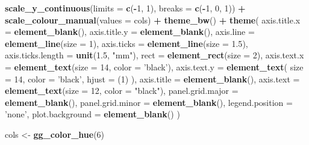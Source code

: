 \documentclass[
]{krantz}
\makeatletter
\newenvironment{Shaded}{\begin{snugshade}}{\end{snugshade}}
\newcommand{\DataTypeTok}[1]{\textcolor[rgb]{0.13,0.29,0.53}{#1}}
\newcommand{\DecValTok}[1]{\textcolor[rgb]{0.00,0.00,0.81}{#1}}
\newcommand{\FloatTok}[1]{\textcolor[rgb]{0.00,0.00,0.81}{#1}}
\newcommand{\KeywordTok}[1]{\textcolor[rgb]{0.13,0.29,0.53}{\textbf{#1}}}
\newcommand{\NormalTok}[1]{#1}
\newcommand{\OperatorTok}[1]{\textcolor[rgb]{0.81,0.36,0.00}{\textbf{#1}}}
\newcommand{\StringTok}[1]{\textcolor[rgb]{0.31,0.60,0.02}{#1}}
\newenvironment{kframe}{%
\medskip{}
\setlength{\fboxsep}{.8em}
 \def\at@end@of@kframe{}%
 \ifinner\ifhmode%
  \def\at@end@of@kframe{\end{minipage}}%
  \begin{minipage}{\columnwidth}%
 \fi\fi%
 \def\FrameCommand##1{\hskip\@totalleftmargin \hskip-\fboxsep
 \colorbox{shadecolor}{##1}\hskip-\fboxsep
     \hskip-\linewidth \hskip-\@totalleftmargin \hskip\columnwidth}%
 \MakeFramed {\advance\hsize-\width
   \@totalleftmargin\z@ \linewidth\hsize
   \@setminipage}}%
 {\par\unskip\endMakeFramed%
 \at@end@of@kframe}
\renewenvironment{Shaded}{\begin{kframe}}{\end{kframe}}
\makeatother
\begin{document}
\begin{Shaded}
\begin{Highlighting}[]
\StringTok{  }\KeywordTok{scale_y_continuous}\NormalTok{(}\DataTypeTok{limits =} \KeywordTok{c}\NormalTok{(}\OperatorTok{-}\DecValTok{1}\NormalTok{, }\DecValTok{1}\NormalTok{), }\DataTypeTok{breaks =} \KeywordTok{c}\NormalTok{(}\OperatorTok{-}\DecValTok{1}\NormalTok{, }\DecValTok{0}\NormalTok{, }\DecValTok{1}\NormalTok{)) }\OperatorTok{+}
\StringTok{  }\KeywordTok{scale_colour_manual}\NormalTok{(}\DataTypeTok{values =}\NormalTok{ cols) }\OperatorTok{+}
\StringTok{  }\KeywordTok{theme_bw}\NormalTok{() }\OperatorTok{+}
\StringTok{  }\KeywordTok{theme}\NormalTok{(}
    \DataTypeTok{axis.title.x =} \KeywordTok{element_blank}\NormalTok{(),}
    \DataTypeTok{axis.title.y =} \KeywordTok{element_blank}\NormalTok{(),}
    \DataTypeTok{axis.line =} \KeywordTok{element_line}\NormalTok{(}\DataTypeTok{size =} \DecValTok{1}\NormalTok{),}
    \DataTypeTok{axis.ticks =} \KeywordTok{element_line}\NormalTok{(}\DataTypeTok{size =} \FloatTok{1.5}\NormalTok{),}
    \DataTypeTok{axis.ticks.length =} \KeywordTok{unit}\NormalTok{(}\FloatTok{1.5}\NormalTok{, }\StringTok{"mm"}\NormalTok{),}
    \DataTypeTok{rect =} \KeywordTok{element_rect}\NormalTok{(}\DataTypeTok{size =} \DecValTok{2}\NormalTok{),}
    \DataTypeTok{axis.text.x =} \KeywordTok{element_text}\NormalTok{(}\DataTypeTok{size =} \DecValTok{14}\NormalTok{, }\DataTypeTok{color =} \StringTok{'black'}\NormalTok{),}
    \DataTypeTok{axis.text.y =}
      \KeywordTok{element_text}\NormalTok{(}
        \DataTypeTok{size =} \DecValTok{14}\NormalTok{,}
        \DataTypeTok{color =} \StringTok{'black'}\NormalTok{,}
        \DataTypeTok{hjust =}\NormalTok{ (}\DecValTok{1}\NormalTok{)}
\NormalTok{      ),}
    \DataTypeTok{axis.title =} \KeywordTok{element_blank}\NormalTok{(),}
    \DataTypeTok{axis.text =} \KeywordTok{element_text}\NormalTok{(}\DataTypeTok{size =} \DecValTok{12}\NormalTok{, }\DataTypeTok{color =} \StringTok{"black"}\NormalTok{),}
    \DataTypeTok{panel.grid.major =} \KeywordTok{element_blank}\NormalTok{(),}
    \DataTypeTok{panel.grid.minor =} \KeywordTok{element_blank}\NormalTok{(),}
    \DataTypeTok{legend.position =} \StringTok{'none'}\NormalTok{,}
    \DataTypeTok{plot.background =} \KeywordTok{element_blank}\NormalTok{()}
\NormalTok{  )}



\NormalTok{cols <-}\StringTok{ }\KeywordTok{gg_color_hue}\NormalTok{(}\DecValTok{6}\NormalTok{)}


\end{Highlighting}
\end{Shaded}
\end{document}
